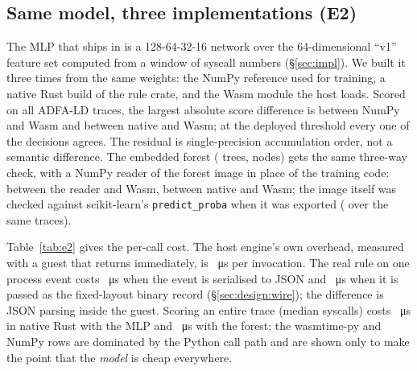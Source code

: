 \subsection{Same model, three implementations (E2)}
\label{sec:eval:e2}
The MLP that ships in \sys is a 128-64-32-16 network over the 64-dimensional
``v1'' feature set computed from a window of syscall numbers
(\S\ref{sec:impl}). We built it three times from the same weights: the NumPy
reference used for training, a native Rust build of the rule crate, and the
Wasm module the host loads. Scored on all \eTwoTraces{} ADFA-LD traces, the
largest absolute score difference is \eTwoMaxDiffNumpyWasm{} between NumPy
and Wasm and \eTwoMaxDiffNativeWasm{} between native and Wasm; at the
deployed threshold every one of the \eTwoTraces{} decisions agrees. The
residual is single-precision accumulation order, not a semantic difference.
The embedded forest (\rfTrees{} trees, \rfNodes{} nodes) gets the same
three-way check, with a NumPy reader of the forest image in place of the
training code: \eTwoRfMaxDiffNumpyWasm{} between the reader and Wasm,
\eTwoRfMaxDiffNativeWasm{} between native and Wasm; the image itself was
checked against scikit-learn's \texttt{predict\_proba} when it was
exported (\rfExporterMaxDiff{} over the same traces).

Table~\ref{tab:e2} gives the per-call cost. The host engine's own overhead,
measured with a guest that returns immediately, is \eTwoEngineOverheadUs{}~\si{\micro\second}
per invocation. The real rule on one process event costs
\eTwoMlJsonUs{}~\si{\micro\second} when the event is serialised to JSON and
\eTwoMlRawUs{}~\si{\micro\second} when it is passed as the fixed-layout
binary record (\S\ref{sec:design:wire}); the difference is JSON parsing inside
the guest. Scoring an entire trace (median \eTwoTraceLen{} syscalls) costs
\eTwoUsPerCallNative{}~\si{\micro\second} in native Rust with the MLP and
\eTwoUsPerCallNativeRf{}~\si{\micro\second} with the forest; the
wasmtime-py and NumPy rows are dominated by the Python call path and are
shown only to make the point that the \emph{model} is cheap everywhere.

\begin{table}[t]
\caption{E2: per-call cost of the same detector in different hosts. Medians;
\texttt{go test -bench} for the first three rows, 30 repetitions per trace
for the rest. Produced by \texttt{e2\_consistency.py} from
\texttt{e2/e2\_results.json}.}
\label{tab:e2}
\centering\footnotesize

\end{table}

